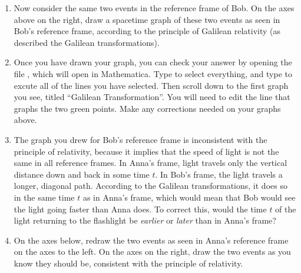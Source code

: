 \begin{center}
\raisebox{0.7in}{Galilean Transformation:}\hspace{0.2in}
\begin{lab_axis}[lab_noticks_4quads,
	width=1.5in, height=1.5in,
	xlabel={$x$},
	ylabel={$t$},
	title={Anna's Frame}
	]
\end{lab_axis}
\hspace{0.3in}
\begin{lab_axis}[lab_noticks_4quads,
	width=1.5in, height=1.5in,
	xlabel={$x$},
	ylabel={$t$},
	title={Bob's Frame}
	]
\end{lab_axis}
\end{center}
\begin{enumerate}

\item 
Now consider the same two events in the reference frame of Bob.  
On the axes above on the right, draw a spacetime graph of these two events as seen in Bob's reference frame, according to the principle of Galilean relativity (as described the Galilean transformations).

\item Once you have drawn your graph, you can check your answer by 
opening the file , which will open in Mathematica.  Type  to select everything, and type  to excute all of the lines you have selected.  Then scroll down to the first graph you see, titled ``Galilean Transformation''.  You will need to edit the line that graphs the two green points.  Make any corrections needed on your graphs above.

\item The graph you drew for Bob's reference frame is inconsistent with the principle of relativity, because it implies that the speed of light is not the same in all reference frames.  In Anna's frame, light travels only the vertical distance down and back in some time $t$.  In Bob's frame, the light travels a longer, diagonal path.  According to the Galilean transformations, it does so in the same time $t$ as in Anna's frame, which would mean that Bob would see the light going faster than Anna does.  To correct this, would the time $t$ of the light returning to the flashlight be \textit{earlier} or \textit{later} than in Anna's frame?
\answerspace{0.4in}

\item On the axes below, redraw the two events as seen in Anna's reference frame on the axes to the left.  On the axes on the right, draw the two events as you know they should be, consistent with the principle of relativity.


\end{enumerate}
